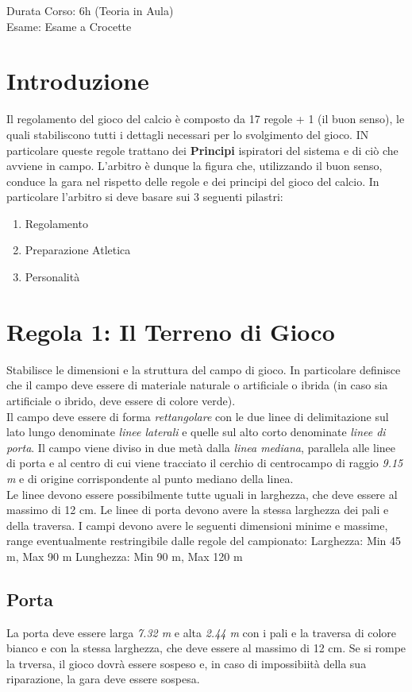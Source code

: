 \documentclass[../uefaC.tex]{subfiles}
\begin{document}

Durata Corso: 6h (Teoria in Aula) \hfill \\
Esame: Esame a Crocette

\section{Introduzione}
Il regolamento del gioco del calcio è composto da 17 regole + 1 (il buon senso), le quali stabiliscono tutti i dettagli necessari per lo svolgimento del gioco. IN particolare queste regole trattano dei \textbf{Principi} ispiratori del sistema e di ciò che avviene in campo. L'arbitro è dunque la figura che, utilizzando il buon senso, conduce la gara nel rispetto delle regole e dei principi del gioco del calcio. In particolare l'arbitro si deve basare sui 3 seguenti pilastri:
\begin{enumerate}
    \item Regolamento
    \item Preparazione Atletica
    \item Personalità
\end{enumerate}

\section{Regola 1: Il Terreno di Gioco}
Stabilisce le dimensioni e la struttura del campo di gioco. In particolare definisce che il campo deve essere di materiale naturale o artificiale o ibrida (in caso sia artificiale o ibrido, deve essere di colore verde). \hfill \\
Il campo deve essere di forma \emph{rettangolare} con le due linee di delimitazione sul lato lungo denominate \emph{linee laterali} e quelle sul alto corto denominate \emph{linee di porta}. Il campo viene diviso in due metà dalla \emph{linea mediana}, parallela alle linee di porta e al centro di cui viene tracciato il cerchio di centrocampo di raggio \emph{9.15 m} e di origine corrispondente al punto mediano della linea. \hfill \\
Le linee devono essere possibilmente tutte uguali in larghezza, che deve essere al massimo di 12 cm. Le linee di porta devono avere la stessa larghezza dei pali e della traversa.
I campi devono avere le seguenti dimensioni minime e massime, range eventualmente restringibile dalle regole del campionato:
Larghezza: Min 45 m, Max 90 m
Lunghezza: Min 90 m, Max 120 m

\subsection{Porta}
La porta deve essere larga \emph{7.32 m} e alta \emph{2.44 m} con i pali e la traversa di colore bianco e con la stessa larghezza, che deve essere al massimo di 12 cm. Se si rompe la trversa, il gioco dovrà essere sospeso e, in caso di impossibiità della sua riparazione, la gara deve essere sospesa.
\end{document}
